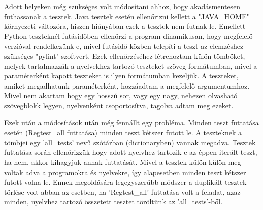 Adott helyeken még szükséges volt módosítani ahhoz, hogy akadásmentesen futhassanak a tesztek. Java tesztek esetén ellenőrizni kellett a "JAVA\_HOME" környezeti változóra, hiszen hiányában ezek a tesztek nem futnak le. Emellett Python teszteknél futásidőben ellenőrzi a program dinamikusan, hogy megfelelő verzióval rendelkezünk-e, mivel futásidő közben telepíti a teszt az elemzéshez szükséges "pylint" szoftvert.
Ezek ellenőrzéséhez létrehoztam külön tömböket, melyek tartalmazzák a nyelvekhez tartozó teszteket szöveg formátumban, mivel a paraméterként kapott teszteket is ilyen formátumban kezeljük.
A teszteket, amiket megadhatunk paraméterként, hozzáadtam a megfelelő argumentumhoz. Mivel nem akartam hogy egy hosszú sor, vagy egy nagy, nehezen olvasható szövegblokk legyen, nyelvenként csoportosítva, tagolva adtam meg ezeket.

Ezek után a módosítások után még fennállt egy probléma. Minden teszt futtatása esetén (Regtest\_all futtatása) minden teszt kétszer futott le. A teszteknek a tömbjei egy 'all\_tests' nevű szótárban (dictionaryben) vannak megadva. Tesztek futtatása során ellenőrizzük hogy adott nyelvhez tartozik-e az éppen iterált teszt, ha nem, akkor kihagyjuk annak futtatását. Mivel a tesztek külön-külön meg voltak adva a programokra és nyelvekre, így alapesetben minden teszt kétszer futott volna le. Ennek megoldására legegyszerűbb módszer a duplikált tesztek törlése volt abban az esetben, ha 'Regtest\_all' futtatása volt a feladat, azaz minden, nyelvhez tartozó összetett tesztet töröltünk az 'all\_tests'-ből. 
